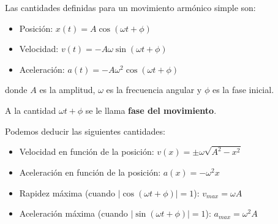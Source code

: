 \begin{tcolorbox}[remember, title=Cantidades Cinemáticas]
  Las cantidades definidas para un movimiento armónico simple son:
  \begin{itemize}
    \item Posición: \( x(t) = A\cos(\omega t + \phi) \)
    \item Velocidad: \( v(t) = -A\omega\sin(\omega t + \phi) \)
    \item Aceleración: \( a(t) = -A\omega^2\cos(\omega t + \phi) \)
  \end{itemize}
  donde \( A \) es la amplitud, \( \omega \) es la frecuencia angular y \( \phi \) es la fase inicial.

  A la cantidad \(\omega t + \phi\) se le llama \textbf{fase del movimiento}.
\end{tcolorbox}

\begin{tcolorbox}[remember, title=A partir de las cantidades cinemáticas]
  Podemos deducir las siguientes cantidades:
  \begin{itemize}
    \item Velocidad en función de la posición: \( v(x) = \pm \omega \sqrt{A^2 - x^2} \)
    \item Aceleración en función de la posición: \( a(x) = -\omega^2 x \)
    \item Rapidez máxima (cuando \(\left\lvert \cos(\omega t + \phi) \right\rvert=1\)): \( v_{max} = \omega A \)
    \item Aceleración máxima (cuando \(\left\lvert \sin(\omega t + \phi) \right\rvert=1\)): \( a_{max} = \omega^2 A \)
  \end{itemize}
\end{tcolorbox}